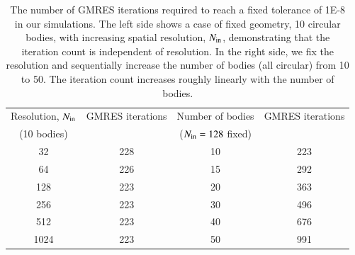 \documentclass[preprint, 10pt]{elsarticle}
\begin{document}
\begin{table}%
\begin{center}
\caption{The number of GMRES iterations required to reach a fixed tolerance of 1E-8 in our simulations. The left side shows a case of fixed geometry, 10 circular bodies, with increasing spatial resolution, $N_{\mathrm{in}}$, demonstrating that the iteration count is independent of resolution. In the right side, we fix the resolution and sequentially increase the number of bodies (all circular) from 10 to 50. The iteration count increases roughly linearly with the number of bodies.
}
\vspace{0.3 pc}
\label{itertab}
\begin{tabular}{c c | c c}
\hline
\hspace{0.5pc} Resolution, $N_{\mathrm{in}}$
\hspace{0.5pc} & GMRES iterations 
\hspace{0.5pc} &  Number of bodies
\hspace{0.5pc} & GMRES iterations  \\
\hspace{0.0pc} (10 bodies) &
\hspace{0.5pc} & ($N_{\mathrm{in}} = 128$ fixed) & \\
\hline
%
32	& 228	& 10 	& 223	\\
64    	& 226	& 15 	& 292	\\
128	& 223	& 20 	& 363	\\
256	& 223	& 30 	& 496	\\
512	& 223	& 40 	& 676	\\
1024	& 223	& 50 	& 991	\\
%
\hline
\end{tabular}
\end{center}
\end{table}
\end{document}
